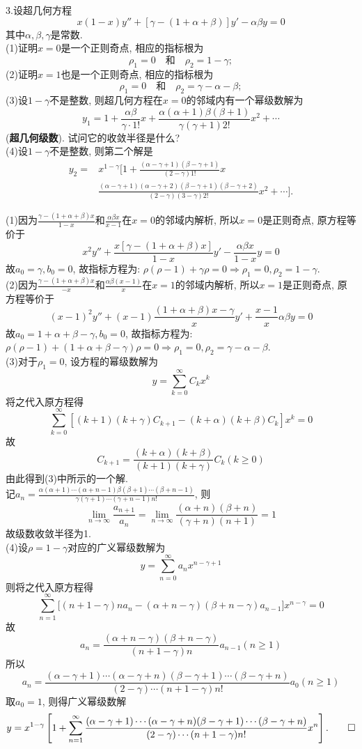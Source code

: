 \documentclass[titlepage,11pt,a4paper,twoside]{report}
\makeatletter
\renewenvironment{proof}{\par
	\pushQED{\qed}%
	\normalfont \topsep1\p@\@plus6\p@\relax
	\trivlist
	\item\relax
	{\hspace*{\parindent}{\heiti 证明}\@addpunct{:}}\hspace\labelsep\ignorespaces
}{%
	\popQED\endtrivlist\@endpefalse
}
\makeatother
\begin{document}
3.设超几何方程
\[x(1-x)y''+[\gamma-(1+\alpha+\beta)]y'-\alpha\beta y=0\]
其中$\alpha,\beta,\gamma$是常数.\\
(1)证明$x=0$是一个正则奇点, 相应的指标根为
\[\rho_1=0\quad\mbox{和}\quad\rho_2=1-\gamma;\]
(2)证明$x=1$也是一个正则奇点, 相应的指标根为
\[\rho_1=0\quad\mbox{和}\quad\rho_2=\gamma-\alpha-\beta;\]
(3)设$1-\gamma$不是整数, 则超几何方程在$x=0$的邻域内有一个幂级数解为
\[y_1=1+\frac{\alpha\beta}{\gamma\cdot1!}x+\frac{\alpha(\alpha+1)\beta(\beta+1)}{\gamma(\gamma+1)2!}x^2+\cdots\]
(\textbf{超几何级数}). 试问它的收敛半径是什么?\\
(4)设$1-\gamma$不是整数, 则第二个解是
\[\begin{split}
y_2=&x^{1-\gamma}\bigg[1+\frac{(\alpha-\gamma+1)(\beta-\gamma+1)}{(2-\gamma)1!}x\\
&\frac{(\alpha-\gamma+1)(\alpha-\gamma+2)(\beta-\gamma+1)(\beta-\gamma+2)}{(2-\gamma)(3-\gamma)2!}x^2+\cdots\bigg].
\end{split}\]
\begin{proof}
(1)因为$\frac{\gamma-(1+\alpha+\beta)x}{1-x}$和$\frac{\alpha\beta x}{x-1}$在$x=0$的邻域内解析, 所以$x=0$是正则奇点, 原方程等价于
\[x^2y''+\frac{x[\gamma-(1+\alpha+\beta)x]}{1-x}y'-\frac{\alpha\beta x}{1-x}y=0\]
故$a_0=\gamma,b_0=0$, 故指标方程为: $\rho(\rho-1)+\gamma\rho=0\Rightarrow\rho_1=0,\rho_2=1-\gamma$.\\
(2)因为$\frac{\gamma-(1+\alpha+\beta)x}{-x}$和$\frac{\alpha\beta(x-1)}{x}$在$x=1$的邻域内解析, 所以$x=1$是正则奇点, 原方程等价于
\[(x-1)^2y''+(x-1)\frac{(1+\alpha+\beta)x-\gamma}{x}y'+\frac{x-1}{x}\alpha\beta y=0\]
故$a_0=1+\alpha+\beta-\gamma,b_0=0$, 故指标方程为: $\rho(\rho-1)+(1+\alpha+\beta-\gamma)\rho=0\Rightarrow\rho_1=0,\rho_2=\gamma-\alpha-\beta$.\\
(3)对于$\rho_1=0$, 设方程的幂级数解为
\[y=\sum_{k=0}^{\infty}C_kx^k\]
将之代入原方程得
\[\sum_{k=0}^{\infty}\left[(k+1)(k+\gamma)C_{k+1}-(k+\alpha)(k+\beta)C_k\right]x^k=0\]
故\[C_{k+1}=\frac{(k+\alpha)(k+\beta)}{(k+1)(k+\gamma)}C_k(k\geq0)\]
由此得到(3)中所示的一个解.\\
记$a_n=\frac{\alpha(\alpha+1)\cdots(\alpha+n-1)\beta(\beta+1)\cdots(\beta+n-1)}{\gamma(\gamma+1)\cdots(\gamma+n-1)n!}$, 则
\[\lim_{n\to\infty}\frac{a_{n+1}}{a_n}=\lim_{n\to\infty}\frac{(\alpha+n)(\beta+n)}{(\gamma+n)(n+1)}=1\]
故级数收敛半径为1.\\
(4)设$\rho=1-\gamma$对应的广义幂级数解为
\[y=\sum_{n=0}^{\infty}a_nx^{n-\gamma+1}\]
则将之代入原方程得
\[\sum_{n=1}^{\infty}\big[(n+1-\gamma)na_n-(\alpha+n-\gamma)(\beta+n-\gamma)a_{n-1}\big]x^{n-\gamma}=0\]
故
\[a_n=\frac{(\alpha+n-\gamma)(\beta+n-\gamma)}{(n+1-\gamma)n}a_{n-1}(n\geq1)\]
所以
\[a_n=\frac{(\alpha-\gamma+1)\cdots(\alpha-\gamma+n)(\beta-\gamma+1)\cdots(\beta-\gamma+n)}{(2-\gamma)\cdots(n+1-\gamma)n!}a_0(n\geq1)\]
取$a_0=1$, 则得广义幂级数解
\[y=x^{1-\gamma}\left[1+\sum_{n=1}^{\infty}\frac{(\alpha-\gamma+1)\cdots(\alpha-\gamma+n)(\beta-\gamma+1)\cdots(\beta-\gamma+n)}{(2-\gamma)\cdots(n+1-\gamma)n!}x^n\right].\qedhere\]
\end{proof}
\end{document}
